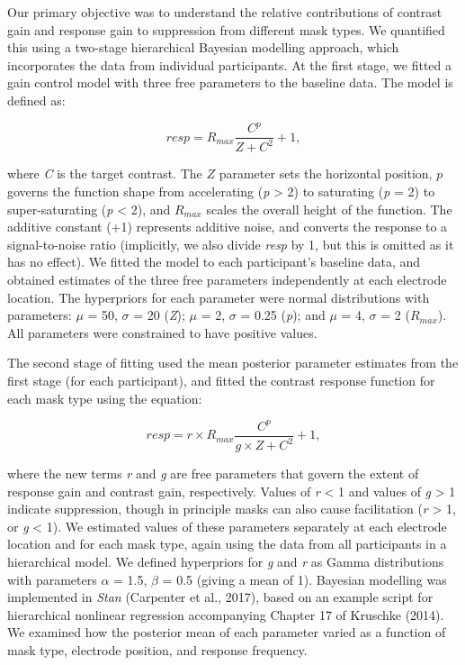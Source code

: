 \documentclass[]{article}
\begin{document}
Our primary objective was to understand the relative contributions of contrast gain and response gain to suppression from different mask types. We quantified this using a two-stage hierarchical Bayesian modelling approach, which incorporates the data from individual participants. At the first stage, we fitted a gain control model with three free parameters to the baseline data. The model is defined as:

\begin{equation}
\label{eq:GC1}
resp = R_{max}\frac{C^p}{Z + C^2} + 1,
\end{equation}

where \emph{C} is the target contrast. The \(Z\) parameter sets the horizontal position, \(p\) governs the function shape from accelerating (\emph{p} \textgreater{} 2) to saturating (\emph{p} = 2) to super-saturating (\emph{p} \textless{} 2), and \(R_{max}\) scales the overall height of the function. The additive constant (+1) represents additive noise, and converts the response to a signal-to-noise ratio (implicitly, we also divide \emph{resp} by 1, but this is omitted as it has no effect). We fitted the model to each participant's baseline data, and obtained estimates of the three free parameters independently at each electrode location. The hyperpriors for each parameter were normal distributions with parameters: \(\mu\) = 50, \(\sigma\) = 20 (\emph{Z}); \(\mu\) = 2, \(\sigma\) = 0.25 (\emph{p}); and \(\mu\) = 4, \(\sigma\) = 2 (\(R_{max}\)). All parameters were constrained to have positive values.

The second stage of fitting used the mean posterior parameter estimates from the first stage (for each participant), and fitted the contrast response function for each mask type using the equation:

\begin{equation}
\label{eq:GC2}
resp = r \times R_{max}\frac{C^p}{g \times Z + C^2} + 1,
\end{equation}

where the new terms \emph{r} and \emph{g} are free parameters that govern the extent of response gain and contrast gain, respectively. Values of \emph{r} \textless{} 1 and values of \emph{g} \textgreater{} 1 indicate suppression, though in principle masks can also cause facilitation (\emph{r} \textgreater{} 1, or \emph{g} \textless{} 1). We estimated values of these parameters separately at each electrode location and for each mask type, again using the data from all participants in a hierarchical model. We defined hyperpriors for \emph{g} and \emph{r} as Gamma distributions with parameters \(\alpha\) = 1.5, \(\beta\) = 0.5 (giving a mean of 1). Bayesian modelling was implemented in \emph{Stan} (Carpenter et al., 2017), based on an example script for hierarchical nonlinear regression accompanying Chapter 17 of Kruschke (2014). We examined how the posterior mean of each parameter varied as a function of mask type, electrode position, and response frequency.
\end{document}
